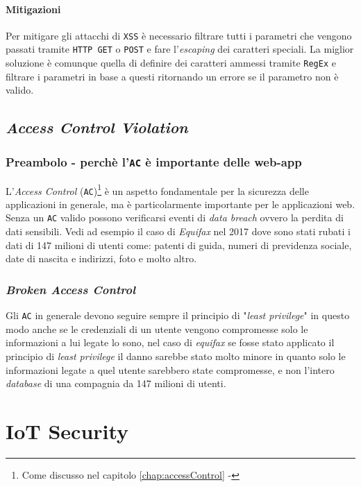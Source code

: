         \paragraph{Mitigazioni} 
            Per mitigare gli attacchi di \texttt{XSS} è necessario filtrare tutti i parametri che vengono passati tramite \texttt{HTTP GET} o \texttt{POST} e fare l'\textit{escaping} dei caratteri speciali. La miglior soluzione è comunque quella di definire dei caratteri ammessi tramite \texttt{RegEx} e filtrare i parametri in base a questi ritornando un errore se il parametro non è valido.
    \subsection{\textit{Access Control Violation}}
        \subsubsection{Preambolo - perchè l'\texttt{AC} è importante delle web-app}
            L'\textit{Access Control} (\texttt{AC})\footnote{Come discusso nel capitolo \ref{chap:accessControl} - } è un aspetto fondamentale per la sicurezza delle applicazioni in generale, ma è particolarmente importante per le applicazioni web. Senza un \texttt{AC} valido possono verificarsi eventi di \textit{data breach} ovvero la perdita di dati sensibili. Vedi ad esempio il caso di \textit{Equifax} nel 2017 dove sono stati rubati i dati di 147 milioni di utenti come: patenti di guida, numeri di previdenza sociale, date di nascita e indirizzi, foto e molto altro. 
        \subsubsection{\textit{Broken Access Control}}
            Gli \texttt{AC} in generale devono seguire sempre il principio di "\textit{least privilege}" in questo modo anche se le credenziali di un utente vengono compromesse solo le informazioni a lui legate lo sono, nel caso di \textit{equifax} se fosse stato applicato il principio di \textit{least privilege} il danno sarebbe stato molto minore in quanto solo le informazioni legate a quel utente sarebbero state compromesse, e non l'intero \textit{database} di una compagnia da 147 milioni di utenti.
\section{IoT Security}
